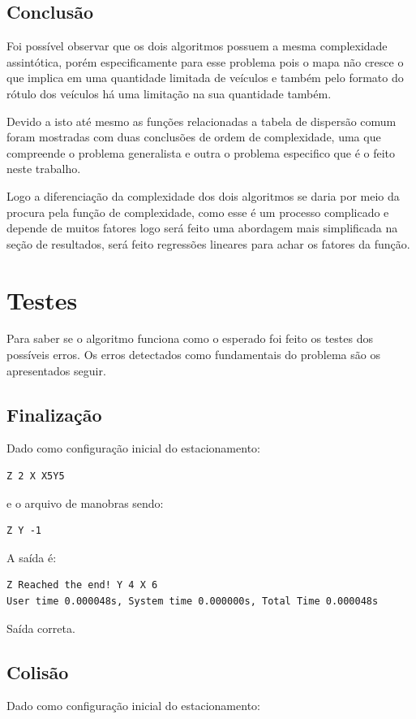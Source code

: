 \documentclass[11pt]{article}
\begin{document}
\subsection{Conclusão}
\label{sec:orgc9d91a5}
Foi possível observar que os dois algoritmos possuem a mesma complexidade assintótica, porém especificamente para esse problema pois o mapa não cresce o que implica em uma quantidade limitada de veículos e também pelo formato do rótulo dos veículos há uma limitação na sua quantidade também.

Devido a isto até mesmo as funções relacionadas a tabela de dispersão comum foram mostradas com duas conclusões de ordem de complexidade, uma que compreende o problema generalista e outra o problema especifico que é o feito neste trabalho.

Logo a diferenciação da complexidade dos dois algoritmos se daria por meio da procura pela função de complexidade, como esse é um processo complicado e depende de muitos fatores logo será feito uma abordagem mais simplificada na seção de resultados, será feito regressões lineares para achar os fatores da função.


\section{Testes}
\label{sec:org22fb8af}
Para saber se o algoritmo funciona como o esperado foi feito os testes dos possíveis erros. Os erros detectados como fundamentais do problema são os apresentados seguir.

\subsection{Finalização}
\label{sec:org1549b6f}
Dado como configuração inicial do estacionamento:
\begin{verbatim}
Z 2 X X5Y5
\end{verbatim}

e o arquivo de manobras sendo:

\begin{verbatim}
Z Y -1
\end{verbatim}

A saída é:

\begin{verbatim}
Z Reached the end! Y 4 X 6
User time 0.000048s, System time 0.000000s, Total Time 0.000048s
\end{verbatim}


Saída correta.

\subsection{Colisão}
\label{sec:org705d0b2}
Dado como configuração inicial do estacionamento:
\end{document}
